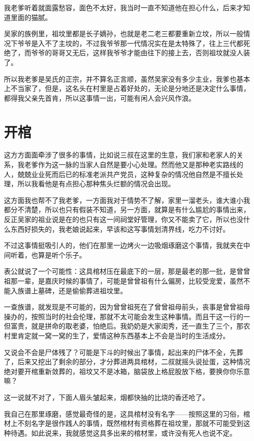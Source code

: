 我老爹听着就面露愁容，面色不太好，我当时一直不知道他在担心什么，后来才知道里面的猫腻。

吴家的族例里，祖坟里都是长子嫡孙，也就是老二老三都要重新立坟，所以一般情况下爷爷是入不了主坟的，不过我爷爷那一代情况实在是太特殊了，往上三代都死绝了，而爷爷的哥哥又无后，这样我爷爷才能由往下的接上去，否则祖坟就没人装了。

所以我老爹是吴氏的正宗，并不算名正言顺，虽然吴家没有多少主业，我爹也基本上不当家了，但是，这名头在村里是占着好处的，无论是分地还是决定什么事情，都得我父亲先首肯，所以这事情一出，可能有闲人会兴风作浪。

\chapter{开棺}

这方方面面牵涉了很多的事情，比如说三叔在这里的生意，我们家和老家人的关系，我老爹作为这一脉的当家人自然是要小心处理。然而他又是那种老实路线的人，兢兢业业死而后已的标准老派共产党员，这种复杂的情况他自然是不擅长处理，所以我看他是有点担心那种焦头烂额的情况会出现。

这方面我也帮不了我老爹，一方面我对于情势不了解，家里一溜老头，谁大谁小我都分不清楚，所以也只有假装不知道，另一方面，就算是有什么尴尬的事情出来，反正吴家的祖业说是在的也只有这一间祠堂好管理，你又不能卖了它，所以也没什么东西好损失的，我老娘说起来，早该和这写事情划清界线，吃力不讨好。

不过这事情挺吸引人的，他们在那里一边烤火一边吸烟琢磨这个事情，我就夹在中间听着，也算是听个乐子。

表公就说了一个可能性：这具棺材压在最底下的一层，那是最老的那一批，是曾曾祖那一辈，是嘉庆时候的事情了，可能是曾曾祖有什么偏房，比较受宠爱，虽然不能入族谱上墓碑，还是偷偷葬进祖坟里。

一查族谱，就发现是不可能的，因为曾曾祖死在了曾曾祖母前头，丧事是曾曾祖母操办的，按照当时的社会伦理，那就不太可能会发生这种事情。而且干这一行的一但富贵，就是拼命的取老婆，怕绝后。我奶奶是大家闺秀，还一直生了三个，那农村里肯定就一窝一窝的生了，爱情这种东西基本上不会是当时的生活成分。

又说会不会是尸体残了？可能是下斗的时候出了事情，起出来的尸体不全，先葬了，后来又挖出了剩余的部分，才分葬进两具棺材，二叔就摇头说扯蛋，这种情况绝对要开棺重新敛葬的，祖坟又不是冰箱，脑袋放上格屁股放下格，要换你你乐意嘛？

这一说就不对了，下面人眉头皱起来，烟都快抽的比烧的香还呛了。

我自己在那里琢磨，感觉最奇怪的是，这具棺材没有名字——按照这里的习俗，棺材上不刻名字是很作践人的事情，既然棺材有资格葬在祖坟里，那就不可能受到这种待遇。如此说来，我就感觉这具多出来的棺材里，或许没有死人也说不定。

